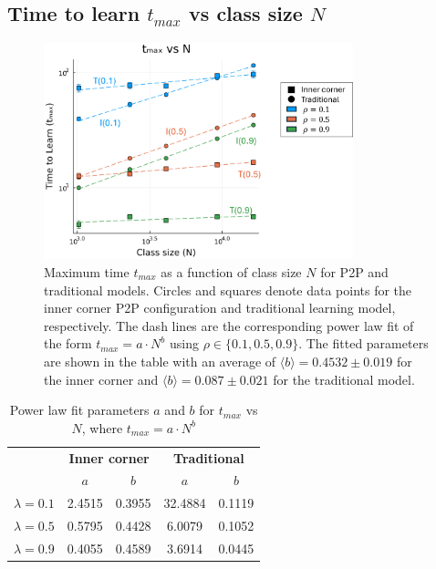 \newpage

\subsection{Time to learn $t_{max}$ vs class size $N$} \label{subsec: 2DBPCA tmax vs N}
\begin{figure}[h!]
    \centering
    \includegraphics[width=0.8\textwidth]{figures/2D-BPCA-analysis/N_vs_tmax-traditional-inner_corner.png}
    \caption[Class size dependence of time to learn in homogenous models]{Maximum time $t_{max}$ as a function of class size $N$ for P2P and traditional models. 
    Circles and squares denote data points for the inner corner P2P configuration and traditional learning model, respectively. 
    The dash lines are the corresponding power law fit of the form $t_{max}=a \cdot N^b$ using $\rho \in \lbrace 0.1, 0.5, 0.9 \rbrace$. 
    The fitted parameters are shown in the table with an average of $\langle b \rangle = 0.4532 \pm 0.019$ for the inner corner and $\langle b \rangle = 0.087\pm0.021$ for the traditional model.}
    \label{fig:Traditional vs PI tmax vs N}
\end{figure}

\begin{table}[htbp!]
  \centering
  
  \begin{tabular}{|c|cc|cc|}
    \hline
    & \multicolumn{2}{c|}{\textbf{Inner corner}}       & \multicolumn{2}{c|}{\textbf{Traditional}}        \\ \cline{2-5} 
    & \multicolumn{1}{c|}{\textbf{$a$}} & \textbf{$b$} & \multicolumn{1}{c|}{\textbf{$a$}} & \textbf{$b$} \\ \hline
    \textbf{$\lambda=0.1$} & \multicolumn{1}{c|}{2.4515}       & 0.3955       & \multicolumn{1}{c|}{32.4884}      & 0.1119       \\ \hline
    \textbf{$\lambda=0.5$} & \multicolumn{1}{c|}{0.5795}       & 0.4428       & \multicolumn{1}{c|}{6.0079}       & 0.1052       \\ \hline
    \textbf{$\lambda=0.9$} & \multicolumn{1}{c|}{0.4055}       & 0.4589       & \multicolumn{1}{c|}{3.6914}       & 0.0445       \\ \hline
  \end{tabular}
  \caption{Power law fit parameters $a$ and $b$ for $t_{max}$ vs $N$, where $t_{max}=a \cdot N ^ b$}
  \label{tab:2DBPCA tmax vs N fit params}
\end{table}

